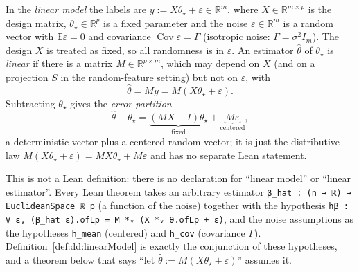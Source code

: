 \begin{definition}\label{def:dd:linearModel}
In the \emph{linear model} the labels are $y:=X\theta_\star+\varepsilon\in\mathbb R^m$, where $X\in\mathbb R^{m\times p}$ is the design matrix, $\theta_\star\in\mathbb R^p$ is a fixed parameter and the noise $\varepsilon\in\mathbb R^m$ is a random vector with
$\mathbb E\varepsilon=0$ and covariance $\operatorname{Cov}\varepsilon=\Gamma$ (isotropic noise: $\Gamma=\sigma^2I_m$). The design $X$ is treated as fixed, so all randomness is in $\varepsilon$.
An estimator $\hat\theta$ of $\theta_\star$ is \emph{linear} if there is a matrix $M\in\mathbb R^{p\times m}$, which may depend on $X$ (and on a projection $S$ in the random-feature setting) but not on $\varepsilon$, with
\[
  \hat\theta=My=M(X\theta_\star+\varepsilon).
\]
Subtracting $\theta_\star$ gives the \emph{error partition}
\[
  \hat\theta-\theta_\star=\underbrace{(MX-I)\theta_\star}_{\text{fixed}}+\underbrace{M\varepsilon}_{\text{centered}},
\]
a deterministic vector plus a centered random vector; it is just the distributive law $M(X\theta_\star+\varepsilon)=MX\theta_\star+M\varepsilon$ and has no separate Lean statement.
\end{definition}

This is not a Lean definition: there is no declaration for ``linear model'' or ``linear estimator''. Every Lean theorem takes an arbitrary estimator \texttt{β\_hat : (n → ℝ) → EuclideanSpace ℝ p} (a function of the noise) together with the hypothesis
\texttt{hβ : ∀ ε, (β\_hat ε).ofLp = M *ᵥ (X *ᵥ θ.ofLp + ε)}, and the noise assumptions as the hypotheses \texttt{h\_mean} (centered) and \texttt{h\_cov} (covariance $\Gamma$). Definition~\ref{def:dd:linearModel} is exactly the conjunction of these hypotheses,
and a theorem below that says ``let $\hat\theta:=M(X\theta_\star+\varepsilon)$'' assumes it.

